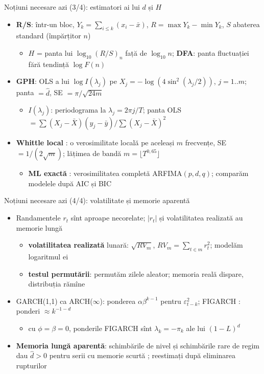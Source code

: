 \begin{frame}{Noțiuni necesare azi (3/4): estimatori ai lui $d$ și $H$}
\itemsize{\small}
\begin{itemize}
    \item \textbf{R/S}: într-un bloc, $Y_k = \sum_{i\le k}(x_i - \bar x)$, $R = \max Y_k - \min Y_k$, $S$ abaterea standard (împărțitor $n$)
    \begin{itemize}
        \item $H$ = panta lui $\log_{10}(R/S)_n$ față de $\log_{10}n$; \textbf{DFA}: panta fluctuației fără tendință $\log F(n)$
    \end{itemize}
    \item \textbf{GPH}: OLS a lui $\log I(\lambda_j)$ pe $X_j = -\log(4\sin^2(\lambda_j/2))$, $j = 1..m$; panta $= \hat d$, SE $= \pi/\sqrt{24m}$
    \begin{itemize}
        \item $I(\lambda_j)$: periodograma la $\lambda_j = 2\pi j/T$; panta OLS $= \sum(X_j - \bar X)(y_j - \bar y)/\sum(X_j - \bar X)^2$
    \end{itemize}
    \item \textbf{Whittle local} : o verosimilitate locală pe aceleași $m$ frecvențe, SE $= 1/(2\sqrt m)$; lățimea de bandă $m = \lfloor T^{0{,}65}\rfloor$
    \begin{itemize}
        \item \textbf{ML exactă} : verosimilitatea completă ARFIMA$(p,d,q)$; comparăm modelele după AIC și BIC
    \end{itemize}
\end{itemize}
\end{frame}

\begin{frame}{Noțiuni necesare azi (4/4): volatilitate și memorie aparentă}
\itemsize{\small}
\begin{itemize}
    \item Randamentele $r_t$ sînt aproape necorelate; $|r_t|$ și volatilitatea realizată au memorie lungă 
    \begin{itemize}
        \item \textbf{volatilitatea realizată} lunară: $\sqrt{RV_m}$, $RV_m = \sum_{t\in m} r_t^2$; modelăm logaritmul ei
        \item \textbf{testul permutării}: permutăm zilele aleator; memoria reală dispare, distribuția rămîne
    \end{itemize}
    \item GARCH(1,1) ca ARCH($\infty$): ponderea $\alpha\beta^{k-1}$ pentru $\varepsilon_{t-k}^2$; FIGARCH : ponderi $\approx k^{-1-d}$
    \begin{itemize}
        \item cu $\phi = \beta = 0$, ponderile FIGARCH sînt $\lambda_k = -\pi_k$ ale lui $(1-L)^d$
    \end{itemize}
    \item \textbf{Memoria lungă aparentă}: schimbările de nivel și schimbările rare de regim dau $\hat d > 0$ pentru serii cu memorie scurtă ; reestimați după eliminarea rupturilor
\end{itemize}
\end{frame}


